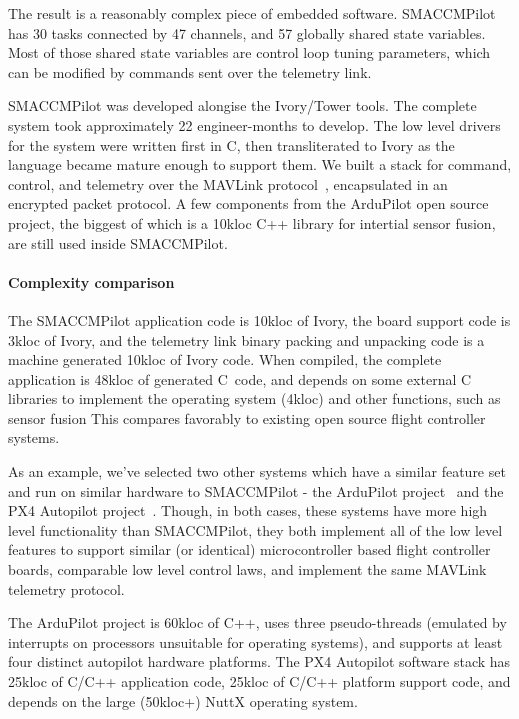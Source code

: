 The result is a reasonably complex piece of embedded software. SMACCMPilot has
30 tasks connected by 47 channels, and 57 globally shared state variables. Most
of those shared state variables are control loop tuning parameters, which can be
modified by commands sent over the telemetry link.

SMACCMPilot was developed alongise the Ivory/Tower tools.  The complete system
took approximately 22 engineer-months to develop.  The low level drivers for the
system were written first in C, then transliterated to Ivory as the language
became mature enough to support them. We built a stack for command, control, and
telemetry over the MAVLink protocol~\cite{mavlink}, encapsulated in an encrypted
packet protocol. A few components from the ArduPilot open source project, the
biggest of which is a 10kloc C++ library for intertial sensor fusion, are still
used inside SMACCMPilot.

\paragraph{Complexity comparison}
The SMACCMPilot application code is 10kloc of Ivory, the board support code
is 3kloc of Ivory, and the telemetry link binary packing and unpacking
code is a machine generated 10kloc of Ivory code. When compiled, the complete
application
is 48kloc of generated C~code, and depends on some external C libraries to
implement the operating system (4kloc) and other functions, such as sensor
fusion  This compares favorably to existing open
source flight controller systems.

As an example, we've selected two other systems which have a similar feature set
and run on similar hardware to SMACCMPilot - the ArduPilot
project~\cite{apm-proj} and the PX4 Autopilot project~\cite{px4-proj}. Though,
in both cases, these systems have more high level functionality than
SMACCMPilot, they both implement all of the low level features to support
similar (or identical) microcontroller based flight controller boards,
comparable low level control laws, and implement the same MAVLink telemetry
protocol.

The ArduPilot project is 60kloc of C++, uses three pseudo-threads (emulated by
interrupts on processors unsuitable for operating systems), and supports at
least four distinct autopilot hardware platforms. The PX4 Autopilot software
stack has 25kloc of C/C++ application code, 25kloc of C/C++ platform support
code, and depends on the large (50kloc+) NuttX operating system.

